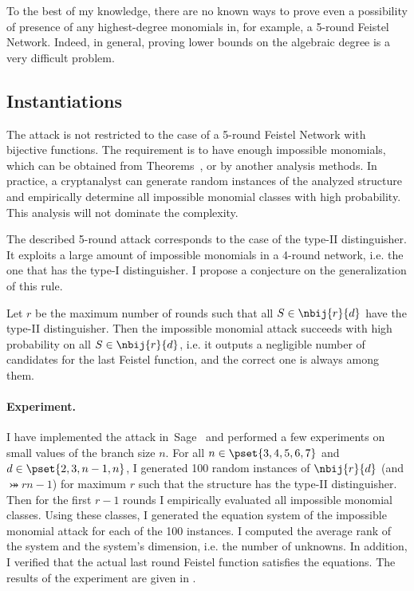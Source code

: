 To the best of my knowledge, there are no known ways to prove even a possibility of presence of any highest-degree monomials in, for example, a 5-round Feistel Network. Indeed, in general, proving lower bounds on the algebraic degree is a very difficult problem. 


\subsection{Instantiations}

The attack is not restricted to the case of a 5-round Feistel Network with bijective functions. The requirement is to have enough impossible monomials, which can be obtained from Theorems~, or by another analysis methods. In practice, a cryptanalyst can generate random instances of the analyzed structure and empirically determine all impossible monomial classes with high probability. This analysis will not dominate the complexity.

The described 5-round attack corresponds to the case of the type-II distinguisher. It exploits a large amount of impossible monomials in a 4-round network, i.e. the one that has the type-I distinguisher. I propose a conjecture on the generalization of this rule.

\begin{conjecture}
Let $r$ be the maximum number of rounds such that all $S \in \nbij{r}{d}$ have the type-II distinguisher. Then the impossible monomial attack succeeds with high probability on all $S \in \nbij{r}{d}$, i.e. it outputs a negligible number of candidates for the last Feistel function, and the correct one is always among them.
\end{conjecture}

\paragraph{Experiment.} I have implemented the attack in~Sage~\cite{sage} and performed a few experiments on small values of the branch size $n$. For all $n \in \pset{3,4,5,6,7}$ and $d \in \pset{2,3,n-1,n}$, I generated 100 random instances of $\nbij{r}{d}$ (and $\bij{r}{n-1}$) for maximum $r$ such that the structure has the type-II distinguisher. Then for the first $r-1$ rounds I empirically evaluated all impossible monomial classes. Using these classes, I generated the equation system of the impossible monomial attack for each of the 100 instances. I computed the average rank of the system and the system's dimension, i.e. the number of unknowns. In addition, I verified that the actual last round Feistel function satisfies the equations. The results of the experiment are given in .


